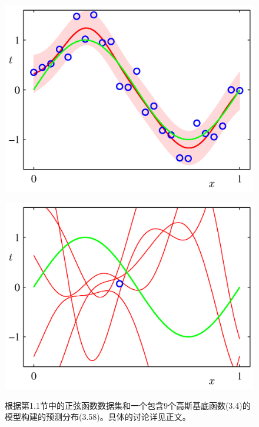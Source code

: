 \documentclass[b5paper]{book}
\numberwithin{equation}{chapter}
\begin{document}
{\begin{figure}[H]
\begin{minipage}[t]{0.5\linewidth}
		\label{fig:3-8c}
		\end{minipage}
		\begin{minipage}[t]{0.5\linewidth}
		\centering
		\includegraphics[scale=0.8]{Images/3-8d.png}
		\label{fig:3-8d}
		\end{minipage}
		\caption{根据第1.1节中的正弦函数数据集和一个包含9个高斯基底函数(3.4)的模型构建的预测分布(3.58)。具体的讨论详见正文。}
		\begin{minipage}[t]{0.5\linewidth}
		\centering
		\includegraphics[scale=0.8]{Images/3-9a.png}
		\label{fig:3-9a}
		\end{minipage}
		\begin{minipage}[t]{0.5\linewidth}
		\centering

\end{minipage}
\end{figure}}
\end{document}

